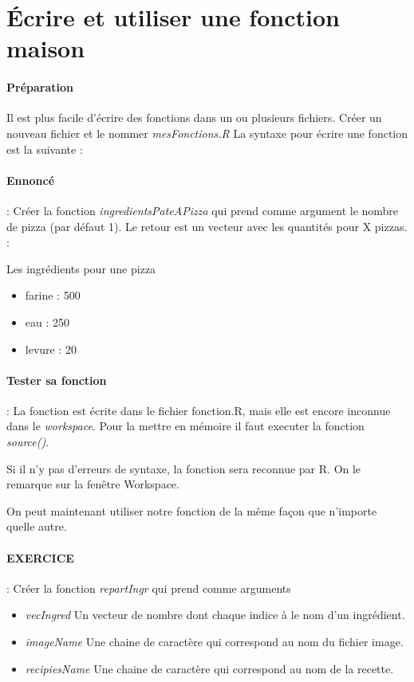 \section{Écrire et utiliser une fonction maison}
\paragraph{Préparation}
Il est plus facile d'écrire des fonctions dans un ou plusieurs fichiers. Créer un nouveau fichier et le nommer \emph{mesFonctions.R}
La syntaxe pour écrire une fonction est la suivante : 

\paragraph{Ennoncé} : Créer la fonction \emph{ingredientsPateAPizza} qui prend comme argument le nombre de pizza (par défaut 1). Le retour est un vecteur avec les quantités pour X pizzas. : 

Les ingrédients pour une pizza
\begin{itemize}
	\item farine : 500
	\item eau : 250
	\item levure : 20
\end{itemize}

\paragraph{Tester sa fonction} : La fonction est écrite dans le fichier fonction.R, mais elle est encore inconnue dans le \emph{workspace}. Pour la mettre en mémoire il faut executer la fonction  \emph{source()}.

Si il n'y pas d'erreurs de syntaxe, la fonction sera reconnue par R. On le remarque sur la fenêtre Workspace.
\par
On peut maintenant utiliser notre fonction de la même façon que n'importe quelle autre.

\paragraph{EXERCICE} : Créer la fonction \emph{repartIngr} qui prend comme arguments 
\begin{itemize}
\item \emph{vecIngred} Un vecteur de nombre dont chaque indice à le nom d'un ingrédient.
\item \emph{imageName} Une chaine de caractère qui correspond au nom du fichier image.
\item \emph{recipiesName} Une chaine de caractère qui correspond au nom de la recette. 
\end{itemize}


